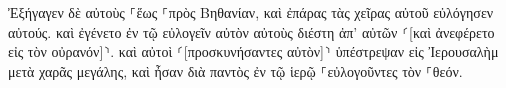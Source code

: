 \documentclass{openreader}
\begin{document}
Ἐξήγαγεν δὲ αὐτοὺς ⸀ἕως ⸀πρὸς Βηθανίαν, καὶ ἐπάρας τὰς χεῖρας αὐτοῦ εὐλόγησεν αὐτούς. 
καὶ ἐγένετο ἐν τῷ εὐλογεῖν αὐτὸν αὐτοὺς διέστη ἀπ’ αὐτῶν ⸂[καὶ ἀνεφέρετο εἰς τὸν οὐρανόν]⸃. 
καὶ αὐτοὶ ⸂[προσκυνήσαντες αὐτὸν]⸃ ὑπέστρεψαν εἰς Ἰερουσαλὴμ μετὰ χαρᾶς μεγάλης, 
καὶ ἦσαν διὰ παντὸς ἐν τῷ ἱερῷ ⸀εὐλογοῦντες τὸν ⸀θεόν. 
\end{document}
